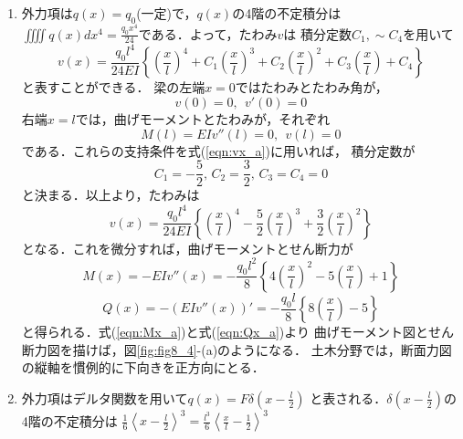 \documentclass[10pt,a4j]{jarticle}
\begin{document}
\begin{enumerate}
\item
外力項は$q(x)=q_0$(一定)で，$q(x)$の4階の不定積分は
$\iiiint q(x)dx^4=\frac{q_0x^4}{24}$である．よって，たわみ$v$は
積分定数$C_1,\sim C_4$を用いて
\begin{equation}
	v(x)= \frac{q_0l^4}{24EI}\left\{
		\left(\frac{x}{l}\right)^4
		+
		C_1
		\left(\frac{x}{l}\right)^3
		+
		C_2
		\left(\frac{x}{l}\right)^2
		+
		C_3
		\left(\frac{x}{l}\right)
		+
		C_4
	\right\}
	\label{eqn:vx_a}
\end{equation}
と表すことができる．
梁の左端$x=0$ではたわみとたわみ角が，
\begin{equation}
	v(0)=0, \ \ v'(0)=0
	\label{eqn:bcon_al}
\end{equation}
右端$x=l$では，曲げモーメントとたわみが，それぞれ
\begin{equation}
	M(l)=EIv''(l)=0, \ \ v(l)=0
	\label{eqn:bcon_al}
\end{equation}
である．これらの支持条件を式(\ref{eqn:vx_a})に用いれば，
積分定数が
\begin{equation}
	C_1=-\frac{5}{2}, \, 
	C_2=\frac{3}{2}, \,
	C_3=C_4=0
	\label{eqn:int_cnst}
\end{equation}
と決まる．以上より，たわみは
\begin{equation}
	v(x)= \frac{q_0l^4}{24EI}\left\{
		\left(\frac{x}{l}\right)^4
		-
		\frac{5}{2}
		\left(\frac{x}{l}\right)^3
		+
		\frac{3}{2}
		\left(\frac{x}{l}\right)^2
	\right\}
	\label{eqn:vx_a_sol}
\end{equation}
となる．これを微分すれば，曲げモーメントとせん断力が
\begin{equation}
	M(x)= 
	-EIv''(x)
	=
	-\frac{q_0l^2}{8}\left\{
		4
		\left(\frac{x}{l}\right)^2
		-
		5
		\left(\frac{x}{l}\right)
		+
		1
	\right\}
	\label{eqn:Mx_a}
\end{equation}
\begin{equation}
	Q(x)= 
	-\left(EIv''(x)\right)'
	=
	-\frac{q_0l}{8}\left\{
		8
		\left(\frac{x}{l}\right)
		-
		5
	\right\}
	\label{eqn:Qx_a}
\end{equation}
と得られる．式(\ref{eqn:Mx_a})と式(\ref{eqn:Qx_a})より
曲げモーメント図とせん断力図を描けば，図\ref{fig:fig8_4}-(a)のようになる．
土木分野では，断面力図の縦軸を慣例的に下向きを正方向にとる．
\item
外力項はデルタ関数を用いて$q(x)=F\delta\left(x-\frac{l}{2}\right)$
と表される．$\delta\left(x-\frac{l}{2}\right)$の4階の不定積分は
$\frac{1}{6}\left<x-\frac{l}{2}\right>^3=\frac{l^3}{6}\left<\frac{x}{l}-\frac{1}{2}\right>^3$

\end{enumerate}
\end{document}
